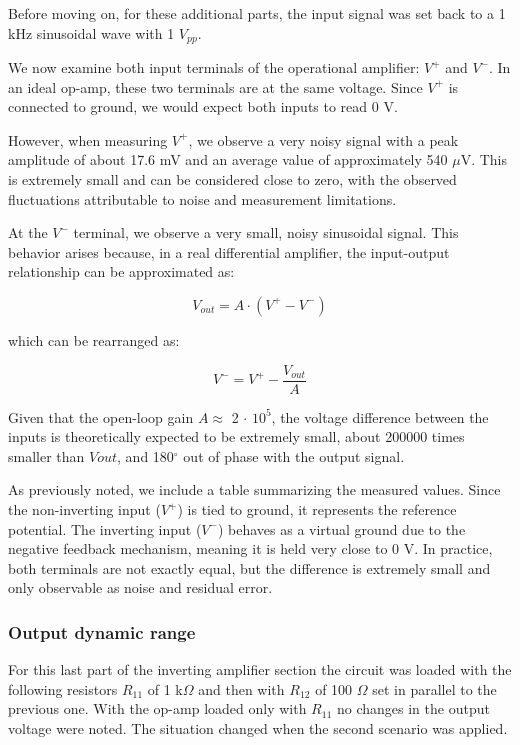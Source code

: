 \documentclass[../main.tex]{subfiles}
\begin{document}
Before moving on, for these additional parts, the input signal was set back to a 1 kHz sinusoidal wave with 1 $V_{pp}$.

We now examine both input terminals of the operational amplifier: $V^+$
  and $V^-$. In an ideal op-amp, these two terminals are at the same voltage. Since $V^+$ is connected to ground, we would expect both inputs to read 0 V.
  
  However, when measuring $V^+$, we observe a very noisy signal with a peak amplitude of about 17.6 mV and an average value of approximately 540 $\mu$V. This is extremely small and can be considered close to zero, with the observed fluctuations attributable to noise and measurement limitations.
  
  At the $V^{-}$ terminal, we observe a very small, noisy sinusoidal signal. This behavior arises because, in a real differential amplifier, the input-output relationship can be approximated as:
  
\begin{equation}
	V_{out} = A \cdot(V^+ - V^-)
\end{equation}

which can be rearranged as:

\begin{equation}
	V^- = V^+ - \frac{V_{out}}{A}
\end{equation}
  
  Given that the open-loop gain $A \approx$ 2 $\cdot$ $10^5$, the voltage difference between the inputs is theoretically expected to be extremely small, about 200000 times smaller than $V{out}$, and 180$^\circ$ out of phase with the output signal.
  
  As previously noted, we include a table summarizing the measured values. Since the non-inverting input ($V^+$) is tied to ground, it represents the reference potential. The inverting input ($V^-$) behaves as a virtual ground due to the negative feedback mechanism, meaning it is held very close to 0 V. In practice, both terminals are not exactly equal, but the difference is extremely small and only observable as noise and residual error.

\subsubsection*{Output dynamic range}

For this last part of the inverting amplifier section the circuit was loaded with the following resistors $R_{11}$ of 1 k$\Omega$ and then with $R_{12}$ of 100 $\Omega$ set in parallel to the previous one.
With the op-amp loaded only with $R_{11}$ no changes in the output voltage were noted. The situation changed when the second scenario was applied.
\end{document}
